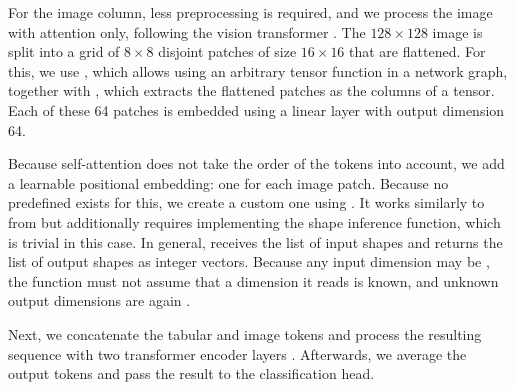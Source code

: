 \documentclass[article,shortnames]{jss}
\theoremstyle{definition}
\renewenvironment{CodeChunk}{\par\addvspace{0.6\baselineskip}\noindent\begin{minipage}{\linewidth}}{\end{minipage}\par\vspace{0.6\baselineskip}}
\begin{document}
For the image column, less preprocessing is required, and we process the image with attention only, following the vision transformer \citep{dosovitskiy2021image}.
The $128 \times 128$ image is split into a grid of $8 \times 8$ disjoint patches of size $16 \times 16$ that are flattened.
For this, we use , which allows using an arbitrary tensor function in a network graph, together with , which extracts the flattened patches as the columns of a tensor.
Each of these 64 patches is embedded using a linear layer with output dimension 64.

\begin{CodeChunk}
\end{CodeChunk}

Because self-attention does not take the order of the tokens into account, we add a learnable positional embedding: one for each image patch.
Because no predefined  exists for this, we create a custom one using .
It works similarly to  from  but additionally requires implementing the shape inference function, which is trivial in this case.
In general,  receives the list of input shapes and returns the list of output shapes as integer vectors. Because any input dimension may be , the function must not assume that a dimension it reads is known, and unknown output dimensions are again .

\begin{CodeChunk}
\end{CodeChunk}

Next, we concatenate the tabular and image tokens and process the resulting sequence with two transformer encoder layers \citep{vaswani2017attention}.
Afterwards, we average the output tokens and pass the result to the classification head.
\end{document}
